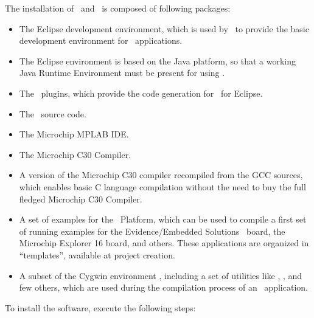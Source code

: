 The installation of \ee\ and \rtd\ is composed of following
packages:
\begin{itemize}
\item The Eclipse development environment, which is used by \rtd\ to
  provide the basic development environment for \ee\ applications.
\item The Eclipse environment is based on the Java platform, so that
  a working Java Runtime Environment must be present for using \rtd.
\item The \rtd\ plugins, which provide the code generation for \ee\
  for Eclipse.
\item The \ee\ source code.
\item The Microchip MPLAB IDE.
\item The Microchip C30 Compiler.
\item A version of the Microchip C30 compiler recompiled from the GCC
  sources, which enables basic C language compilation without the need
  to buy the full fledged Microchip C30 Compiler.
\item A set of examples for the \dspic\ Platform, which can be used to
  compile a first set of running examples for the Evidence/Embedded
  Solutions \flex\ board, the Microchip Explorer 16 board, and
  others. These applications are organized in ``templates'', available
  at project creation.
\item A subset of the Cygwin environment \cite{cygwin}, including
  a set of utilities like \file{make}, \file{gawk}, and few others, which
  are used during the compilation process of an \ee\ application.
\end{itemize}

To install the software, execute the following steps:

